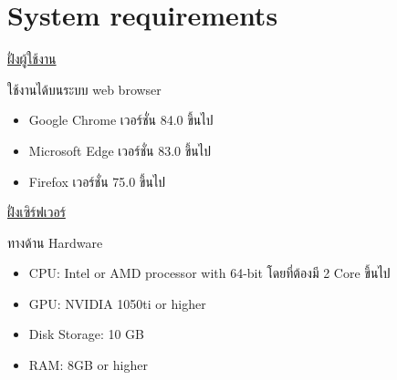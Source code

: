 \section{System requirements}

\underline{ฝั่งผู้ใช้งาน}

ใช้งานได้บนระบบ web browser 

\begin{itemize}
    \item Google Chrome เวอร์ชั่น 84.0 ขึ้นไป 
    \item Microsoft Edge เวอร์ชั่น 83.0 ขึ้นไป
    \item Firefox เวอร์ชั่น 75.0 ขึ้นไป
\end{itemize}
 
\underline{ฝั่งเซิร์ฟเวอร์}
		
ทางด้าน Hardware

        \begin{itemize}
            \item CPU: Intel or AMD processor with 64-bit โดยที่ต้องมี 2 Core ขึ้นไป
            \item GPU: NVIDIA 1050ti or higher
            \item Disk Storage: 10 GB
            \item RAM: 8GB or higher
        \end{itemize}
        
